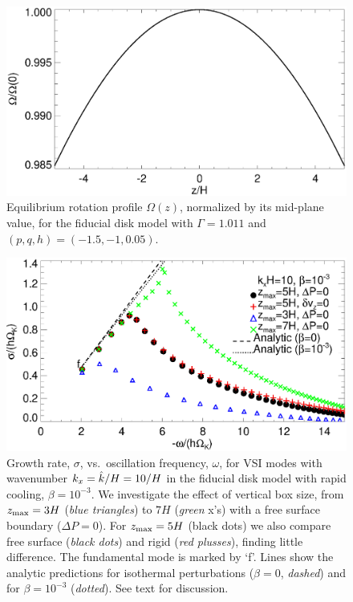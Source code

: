 \begin{figure}
  \includegraphics[width=\linewidth,clip=true,trim=0cm 0cm 0cm
  0cm]{figures/omega2} 
  \caption{Equilibrium rotation profile $\Omega(z)$,
    normalized by its mid-plane value, for  the fiducial disk model with $\Gamma=1.011$
    and $(p,q, h)=(-1.5,-1,0.05)$. 
    \label{omega_z} 
  }
\end{figure}

\begin{figure}
  \includegraphics[width=\linewidth]{figures/compare_modes_iso_kx10_analytic.ps}
  \caption{Growth rate, $\sigma$, vs.\ oscillation frequency, $\omega$, for
  VSI modes with wavenumber $k_x = \hat{k}/H=10/H$ in the fiducial disk model
    with rapid cooling, $\beta=10^{-3}$. %
We investigate the effect of vertical box size, from $z_\mathrm{max}=3H$
(\emph{blue triangles}) to $7H$ (\emph{green} x's)
    with a free surface boundary ($\Delta P=0$).  For $z_\mathrm{max}=5H$  (black dots) we also compare free surface (\emph{black dots}) and rigid (\emph{red plusses}), finding little difference.
      The fundamental mode is marked by `f'. Lines show the analytic predictions for
      isothermal perturbations ($\beta = 0$, \emph{dashed}) and for $\beta = 10^{-3}$ (\emph{dotted}).
      See text for discussion.
    \label{compare_modes_iso_kx10} 
  }
\end{figure}

